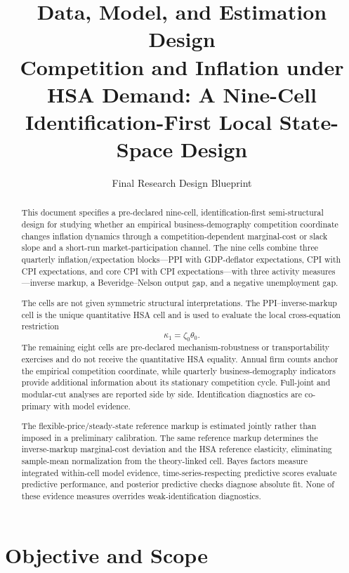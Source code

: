 \documentclass[11pt]{article}
\title{\textbf{Data, Model, and Estimation Design}\\
\large Competition and Inflation under HSA Demand: A Nine-Cell Identification-First Local State-Space Design}
\author{}
\date{Final Research Design Blueprint}
\begin{document}
\maketitle

\begin{abstract}
This document specifies a pre-declared nine-cell, identification-first semi-structural design for studying whether an empirical business-demography competition coordinate changes inflation dynamics through a competition-dependent marginal-cost or slack slope and a short-run market-participation channel. The nine cells combine three quarterly inflation/expectation blocks---PPI with GDP-deflator expectations, CPI with CPI expectations, and core CPI with CPI expectations---with three activity measures---inverse markup, a Beveridge--Nelson output gap, and a negative unemployment gap.

The cells are not given symmetric structural interpretations. The PPI--inverse-markup cell is the unique quantitative HSA cell and is used to evaluate the local cross-equation restriction
\[
\kappa_1=\zeta_0\theta_0.
\]
The remaining eight cells are pre-declared mechanism-robustness or transportability exercises and do not receive the quantitative HSA equality. Annual firm counts anchor the empirical competition coordinate, while quarterly business-demography indicators provide additional information about its stationary competition cycle. Full-joint and modular-cut analyses are reported side by side. Identification diagnostics are co-primary with model evidence.

The flexible-price/steady-state reference markup is estimated jointly rather than imposed in a preliminary calibration. The same reference markup determines the inverse-markup marginal-cost deviation and the HSA reference elasticity, eliminating sample-mean normalization from the theory-linked cell. Bayes factors measure integrated within-cell model evidence, time-series-respecting predictive scores evaluate predictive performance, and posterior predictive checks diagnose absolute fit. None of these evidence measures overrides weak-identification diagnostics.
\end{abstract}

\tableofcontents
\newpage

\section{Objective and Scope}
\end{document}
